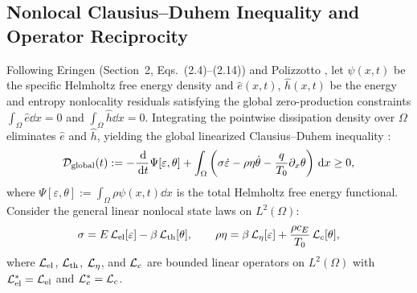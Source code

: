 \subsection{Nonlocal Clausius--Duhem Inequality and Operator Reciprocity}\label{subsec:reciprocity}

Following Eringen \cite{Eringen1974} (Section~2, Eqs.~(2.4)--(2.14)) and Polizzotto \cite{DiLuzio2005,MarottiDeSciarra2009}, let $\psi(x,t)$ be the specific Helmholtz free energy density and $\hat{e}(x,t)$, $\hat{h}(x,t)$ be the energy and entropy nonlocality residuals satisfying the global zero-production constraints $\int_\Omega \hat{e}\dd x = 0$ and $\int_\Omega \hat{h}\dd x = 0$. Integrating the pointwise dissipation density over $\Omega$ eliminates $\hat{e}$ and $\hat{h}$, yielding the global linearized Clausius--Duhem inequality \cite{Eringen1974,GiorgiMorro2025}:
\begin{equation}\label{eq:global_cd}
  \mathcal{D}_{\mathrm{global}}(t) := -\frac{\,\mathrm{d}}{\,\mathrm{d} t}\Psi[\varepsilon,\theta] + \int_\Omega \left(\sigma\dot{\varepsilon} - \rho\eta\dot{\theta} - \frac{q}{T_0}\partial_x\theta\right)\,\mathrm{d} x \ge 0,
\end{equation}
where $\Psi[\varepsilon,\theta] := \int_\Omega \rho\psi(x,t)\dd x$ is the total Helmholtz free energy functional. Consider the general linear nonlocal state laws on $L^2(\Omega)$:
\begin{equation}\label{eq:general_state_laws}
  \sigma = E\,\mathcal{L}_{\mathrm{el}}[\varepsilon] - \beta\,\mathcal{L}_{\mathrm{th}}[\theta], \qquad
  \rho\eta = \beta\,\mathcal{L}_\eta[\varepsilon] + \frac{\rho c_E}{T_0}\,\mathcal{L}_c[\theta],
\end{equation}
where $\mathcal{L}_{\mathrm{el}}$, $\mathcal{L}_{\mathrm{th}}$, $\mathcal{L}_\eta$, and $\mathcal{L}_c$ are bounded linear operators on $L^2(\Omega)$ with $\mathcal{L}_{\mathrm{el}}^* = \mathcal{L}_{\mathrm{el}}$ and $\mathcal{L}_c^* = \mathcal{L}_c$.

